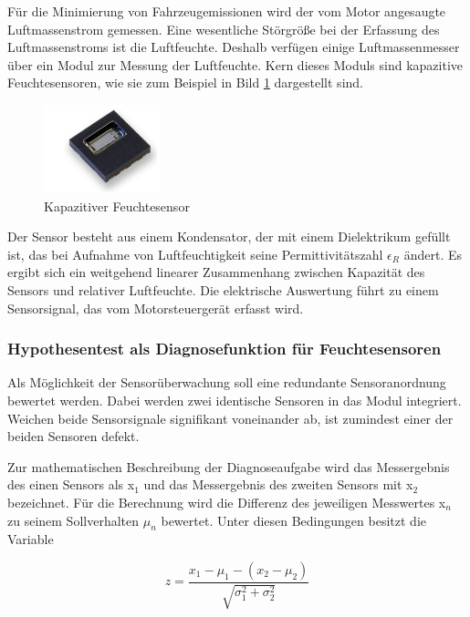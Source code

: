 \noindent F\"{u}r die Minimierung von Fahrzeugemissionen wird der vom Motor angesaugte Luftmassenstrom gemessen. Eine wesentliche St\"{o}rgr\"{o}{\ss}e bei der Erfassung des Luftmassenstroms ist die Luftfeuchte. Deshalb verf\"{u}gen einige Luftmassenmesser \"{u}ber ein Modul zur Messung der Luftfeuchte. Kern dieses Moduls sind kapazitive Feuchtesensoren, wie sie zum Beispiel in Bild \ref{fig:Feuchtesensor} dargestellt sind.

\noindent 
\begin{figure}[H]
  \centerline{\includegraphics[width=0.3\textwidth]{Kapitel6/Bilder/image14}}
  \caption{Kapazitiver Feuchtesensor}
  \label{fig:Feuchtesensor}
\end{figure}

\noindent Der Sensor besteht aus einem Kondensator, der mit einem Dielektrikum gef\"{u}llt ist, das bei Aufnahme von Luftfeuchtigkeit seine Permittivit\"{a}tszahl $\epsilon_{R}$ \"{a}ndert. Es ergibt sich ein weitgehend linearer Zusammenhang zwischen Kapazit\"{a}t des Sensors und relativer Luftfeuchte. Die elektrische Auswertung f\"{u}hrt zu einem Sensorsignal, das vom Motorsteuerger\"{a}t erfasst wird.

\subsubsection{Hypothesentest als Diagnosefunktion f\"{u}r Feuchtesensoren}

\noindent Als M\"{o}glichkeit der Sensor\"{u}berwachung soll eine redundante Sensoranordnung bewertet werden. Dabei werden zwei identische Sensoren in das Modul integriert. Weichen beide Sensorsignale signifikant voneinander ab, ist zumindest einer der beiden Sensoren defekt.\newline

\noindent Zur mathematischen Beschreibung der Diagnoseaufgabe wird das Messergebnis des einen Sensors als x$_{1}$ und das Messergebnis des zweiten Sensors mit x$_{2}$ bezeichnet. F\"{u}r die Berechnung wird die Differenz des jeweiligen Messwertes x$_{n}$ zu seinem Sollverhalten $\mu_{n}$ bewertet. Unter diesen Bedingungen besitzt die Variable 

\begin{equation}\label{eq:sixonehundredsixty}
z=\dfrac{x_{1} -\mu _{1} -(x_{2} -\mu _{2})}{\sqrt{\sigma _{1}^{2} +\sigma _{2}^{2}}}
\end{equation}

